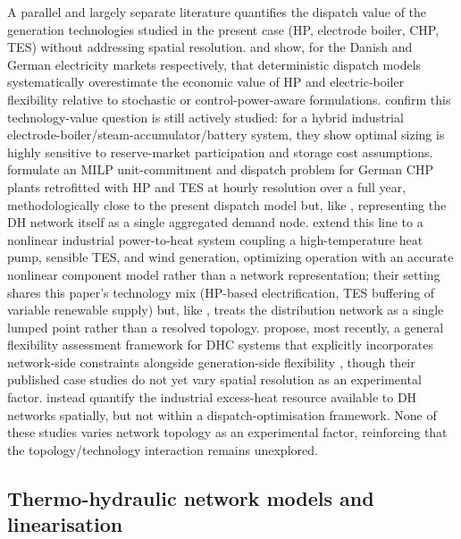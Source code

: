 \documentclass[a4paper,fleqn]{cas-dc}
\begin{document}
A parallel and largely separate literature quantifies the dispatch
value of the generation technologies studied in the present case
(HP, electrode boiler, CHP, TES) without addressing spatial
resolution. \citet{Nielsen2016} and \citet{Boettger2015} show, for
the Danish and German electricity markets respectively, that
deterministic dispatch models systematically overestimate the
economic value of HP and electric-boiler flexibility relative to
stochastic or control-power-aware formulations. \citet{Galteland2026} confirm this technology-value
question is still actively studied: for a hybrid industrial
electrode-boiler/steam-accumulator/battery system, they show optimal
sizing is highly sensitive to reserve-market participation and
storage cost assumptions. \citet{Mollenhauer2018} formulate an MILP
unit-commitment and dispatch problem for German CHP plants
retrofitted with HP and TES at hourly resolution over a full year,
methodologically close to the present dispatch model but, like
\citet{Schweiger2017_p2h,Averfalk2017,David2017},
representing the DH network itself as a single aggregated demand
node. \citet{Walden2023} extend this line to a nonlinear industrial
power-to-heat system coupling a high-temperature heat pump, sensible
TES, and wind generation, optimizing operation with an accurate
nonlinear component model rather than a network representation;
their setting shares this paper's technology mix (HP-based
electrification, TES buffering of variable renewable supply) but,
like \citet{Mollenhauer2018}, treats the distribution network as a
single lumped point rather than a resolved topology.
\citet{Riedl2026} propose, most recently, a general flexibility
assessment framework for DHC systems that explicitly incorporates
network-side constraints alongside generation-side flexibility , though their published
case studies do not yet vary spatial resolution as an experimental
factor. \citet{Buhler2017} instead quantify the industrial excess-heat
resource available to DH networks spatially, but not within a
dispatch-optimisation  framework. None of these studies varies
network topology as an experimental factor, reinforcing that the
topology/technology interaction remains unexplored.

\subsection{Thermo-hydraulic network models and linearisation}
\label{sec:rw_thermo-hydraulic}
\end{document}
